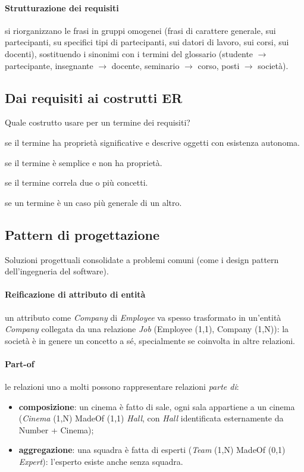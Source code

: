 \documentclass[a4paper,12pt]{article}
\begin{document}
\paragraph{Strutturazione dei requisiti} si riorganizzano le frasi in gruppi
omogenei (frasi di carattere generale, sui partecipanti, su specifici tipi di
partecipanti, sui datori di lavoro, sui corsi, sui docenti), sostituendo i
sinonimi con i termini del glossario (studente $\to$ partecipante, insegnante
$\to$ docente, seminario $\to$ corso, posti $\to$ società).

\subsection{Dai requisiti ai costrutti ER}

Quale costrutto usare per un termine dei requisiti?
\begin{description}[style=nextline]
  \item[Entità] se il termine ha proprietà significative e descrive oggetti
    con esistenza autonoma.
  \item[Attributo] se il termine è semplice e non ha proprietà.
  \item[Relazione] se il termine correla due o più concetti.
  \item[Generalizzazione] se un termine è un caso più generale di un altro.
\end{description}

\subsection{Pattern di progettazione}

Soluzioni progettuali consolidate a problemi comuni (come i design pattern
dell'ingegneria del software).

\paragraph{Reificazione di attributo di entità} un attributo come
\emph{Company} di \emph{Employee} va spesso trasformato in un'entità
\emph{Company} collegata da una relazione \emph{Job} (Employee (1,1), Company
(1,N)): la società è in genere un concetto a sé, specialmente se coinvolta in
altre relazioni.

\paragraph{Part-of} le relazioni uno a molti possono rappresentare relazioni
\emph{parte di}:
\begin{itemize}
  \item \textbf{composizione}: un cinema è fatto di sale, ogni sala appartiene
    a un cinema (\emph{Cinema} (1,N) MadeOf (1,1) \emph{Hall}, con \emph{Hall}
    identificata esternamente da Number + Cinema);
  \item \textbf{aggregazione}: una squadra è fatta di esperti (\emph{Team}
    (1,N) MadeOf (0,1) \emph{Expert}): l'esperto esiste anche senza squadra.
\end{itemize}
\end{document}
